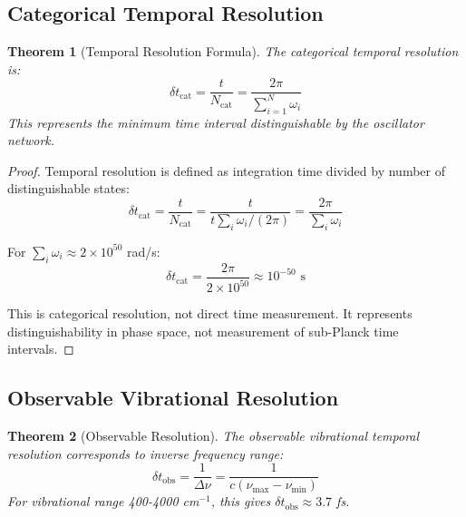 \documentclass[twocolumn,10pt]{article}
\newtheorem{theorem}{Theorem}[section]
\begin{document}
\subsection{Categorical Temporal Resolution}

\begin{theorem}[Temporal Resolution Formula]
\label{thm:temporal_resolution}
The categorical temporal resolution is:
\begin{equation}
\delta t_{\text{cat}} = \frac{t}{N_{\text{cat}}} = \frac{2\pi}{\sum_{i=1}^N \omega_i}
\end{equation}
This represents the minimum time interval distinguishable by the oscillator network.
\end{theorem}

\begin{proof}
Temporal resolution is defined as integration time divided by number of distinguishable states:
\begin{equation}
\delta t_{\text{cat}} = \frac{t}{N_{\text{cat}}} = \frac{t}{t\sum_i \omega_i/(2\pi)} = \frac{2\pi}{\sum_i \omega_i}
\end{equation}

For $\sum_i \omega_i \approx 2 \times 10^{50}$ rad/s:
\begin{equation}
\delta t_{\text{cat}} = \frac{2\pi}{2 \times 10^{50}} \approx 10^{-50} \text{ s}
\end{equation}

This is categorical resolution, not direct time measurement. It represents distinguishability in phase space, not measurement of sub-Planck time intervals.
\end{proof}

\subsection{Observable Vibrational Resolution}

\begin{theorem}[Observable Resolution]
\label{thm:observable_resolution}
The observable vibrational temporal resolution corresponds to inverse frequency range:
\begin{equation}
\delta t_{\text{obs}} = \frac{1}{\Delta\nu} = \frac{1}{c(\nu_{\max} - \nu_{\min})}
\end{equation}
For vibrational range 400-4000 cm$^{-1}$, this gives $\delta t_{\text{obs}} \approx 3.7$ fs.
\end{theorem}
\end{document}
